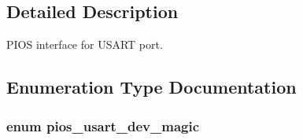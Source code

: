 \subsection{Detailed Description}
P\-I\-O\-S interface for U\-S\-A\-R\-T port. 

\subsection{Enumeration Type Documentation}
\hypertarget{group___p_i_o_s___u_s_a_r_t_gabc5ff4f4da76683608f4140d4e343a32}{
\subsubsection[{pios\-\_\-usart\-\_\-dev\-\_\-magic}]{\setlength{\rightskip}{0pt plus 5cm}enum {\bf pios\-\_\-usart\-\_\-dev\-\_\-magic}}}\label{group___p_i_o_s___u_s_a_r_t_gabc5ff4f4da76683608f4140d4e343a32}
